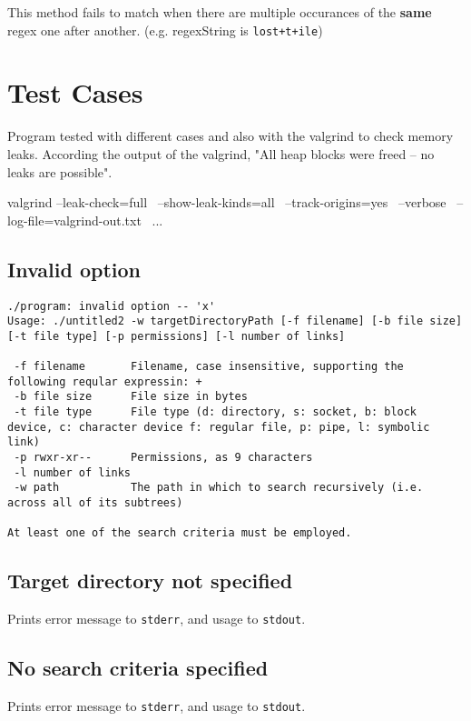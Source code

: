 \documentclass[a4paper]{article}
\begin{document}
This method fails to match when there are multiple occurances of the \textbf{same} regex one after another. (e.g. regexString is \texttt{lost+t+ile}) 

\section{Test Cases}
Program tested with different cases and also with the valgrind to check memory leaks. According the output of the valgrind, "All heap blocks were freed -- no leaks are possible".

\begin{ccode}
valgrind --leak-check=full \
         --show-leak-kinds=all \
         --track-origins=yes \
         --verbose \
         --log-file=valgrind-out.txt \
         ...
\end{ccode}

\newpage

\subsection{Invalid option}


\begin{verbatim}
./program: invalid option -- 'x'
Usage: ./untitled2 -w targetDirectoryPath [-f filename] [-b file size] [-t file type] [-p permissions] [-l number of links] 

 -f filename       Filename, case insensitive, supporting the following reqular expressin: +
 -b file size      File size in bytes
 -t file type      File type (d: directory, s: socket, b: block device, c: character device f: regular file, p: pipe, l: symbolic link)
 -p rwxr-xr--      Permissions, as 9 characters
 -l number of links
 -w path           The path in which to search recursively (i.e. across all of its subtrees)

At least one of the search criteria must be employed.
\end{verbatim}

\subsection{Target directory not specified}
Prints error message to \texttt{stderr}, and usage to \texttt{stdout}.
\subsection{No search criteria specified}
Prints error message to \texttt{stderr}, and usage to \texttt{stdout}.
\end{document}
